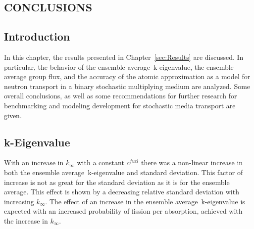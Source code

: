 
\begin{center}
\section{CONCLUSIONS}
\label{sec:Conclusions}
\end{center}

\aboveSubSecSkip

\subsection{Introduction}
\label{sec:Conclusions-Intro}

\noindent
	\indent In this chapter, the results presented in Chapter~\ref{sec:Results} are discussed.
	In particular, the behavior of the ensemble average~k-eigenvalue, the ensemble average
	group flux, and the accuracy of the atomic approximation as a model for neutron transport
	in a binary stochastic multiplying medium are analyzed.  Some overall conclusions, as well
	as some recommendations for further research for benchmarking and modeling
	development for stochastic media transport are given.
			
\belowSubSecSkip

\subsection{k-Eigenvalue}
\label{sec:Conclusions-k}

\noindent
	\indent With an increase in ${k_{\infty}}$ with a constant ${c^{fuel}}$ there was a
	non-linear increase in both the ensemble average~k-eigenvalue and standard deviation.
	This factor of increase is not as great for the standard deviation as it is for the ensemble
	average.  This effect is shown by a decreasing relative standard deviation with increasing
	${k_{\infty}}$.  The effect of an increase in the ensemble average~k-eigenvalue is expected
	with an increased probability of fission per absorption, achieved with the increase
	in ${k_{\infty}}$.  
	
